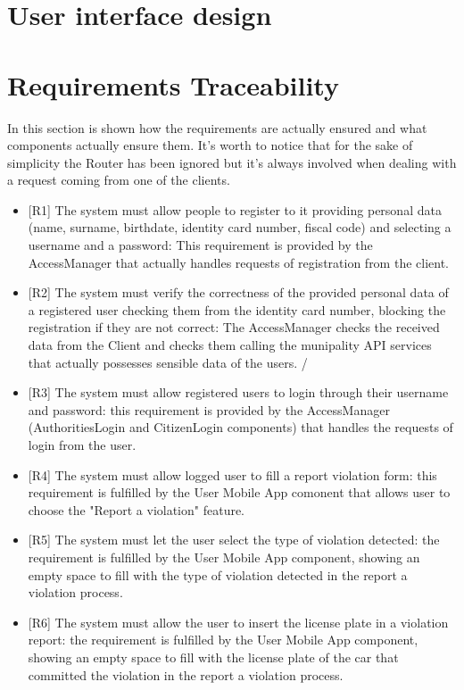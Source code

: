 \documentclass[a4paper]{report}
\begin{document}
\chapter{User interface design}

\chapter{Requirements Traceability}

In this section is shown how the requirements are actually ensured and what components actually ensure them. It's worth to notice that for the sake of simplicity the Router has been ignored but it's always involved when dealing with a request coming from one of the clients. 
\begin{itemize}
\item {[R1]}	\label{R1}The system must allow people to register to it providing personal data (name, surname, birthdate, identity card number, fiscal code) and selecting a username and a password: This requirement is provided by the AccessManager that actually handles requests of registration from the client.
\item {[R2]}	\label{R2}The system must verify the correctness of the provided personal data of a registered user checking them from the identity card number, blocking the registration if they are not correct: The AccessManager checks the received data from the Client and checks them calling the munipality API services that actually possesses sensible data of the users. /
\item {[R3]}	\label{R3}The system must allow registered users to login through their username and password: this requirement is provided by the AccessManager (AuthoritiesLogin and CitizenLogin components) that handles the requests of login from the user. 
\item {[R4]}	\label{R4}The system must allow logged user to fill a report violation form: this requirement is fulfilled by the User Mobile App comonent that allows user to choose the "Report a violation" feature.
\item {[R5]}	\label{R5}The system must let the user select the type of violation detected: the requirement is fulfilled by the User Mobile App component, showing an empty space to fill with the type of violation detected in the report a violation process.
\item {[R6]}	\label{R6}The system must allow the user to insert the license plate in a violation report:  the requirement is fulfilled by the User Mobile App component, showing an empty space to fill with the license plate of the car that committed the violation in the report a violation process.

\end{itemize}
\end{document}
